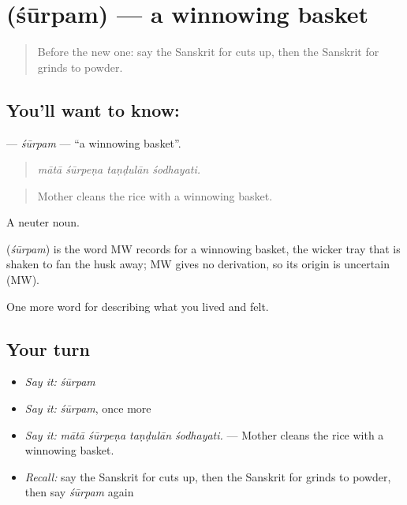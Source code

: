 \section[\texorpdfstring{\sk{शूर्पम्} (śūrpam)}{शूर्पम् (śūrpam)}]{ (śūrpam) — a winnowing basket}

\label{lesson:SA-C512-surpam}



\begin{quote}
Before the new one: say the Sanskrit for cuts up, then the Sanskrit for grinds to powder.
\end{quote}

\subsection*{You'll want to know: }
\textbf{} — \emph{śūrpam} — \textquotedblleft{}a winnowing basket\textquotedblright{}.

\begin{quote}
   
\end{quote}

\begin{quote}
\emph{mātā śūrpeṇa taṇḍulān śodhayati.}
\end{quote}

\begin{quote}
Mother cleans the rice with a winnowing basket.
\end{quote}

A neuter noun.

\begin{cousinweb}
\textbf{} (\emph{śūrpam}) is the word MW records for a winnowing basket, the wicker tray that is shaken to fan the husk away; MW gives no derivation, so its origin is uncertain (MW).
\end{cousinweb}

\begin{grammarlens}[title={What you've built}]
One more word for describing what you lived and felt.
\end{grammarlens}

\subsection*{Your turn}
\begin{itemize}
\raggedright
  \item \emph{Say it:} \emph{śūrpam}
  \item \emph{Say it:} \emph{śūrpam}, once more
  \item \emph{Say it:} \emph{mātā śūrpeṇa taṇḍulān śodhayati.} — Mother cleans the rice with a winnowing basket.
  \item \emph{Recall:} say the Sanskrit for cuts up, then the Sanskrit for grinds to powder, then say \emph{śūrpam} again
\end{itemize}

